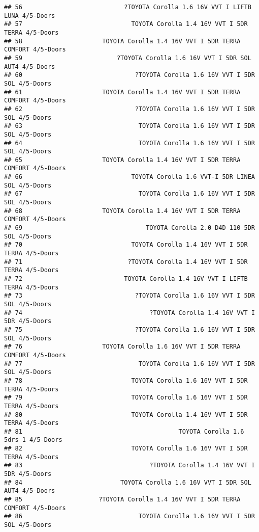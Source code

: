 \documentclass[]{article}
\begin{document}
\begin{verbatim}
## 56                            ?TOYOTA Corolla 1.6 16V VVT I LIFTB LUNA 4/5-Doors
## 57                              TOYOTA Corolla 1.4 16V VVT I 5DR TERRA 4/5-Doors
## 58                      TOYOTA Corolla 1.4 16V VVT I 5DR TERRA COMFORT 4/5-Doors
## 59                          ?TOYOTA Corolla 1.6 16V VVT I 5DR SOL AUT4 4/5-Doors
## 60                               ?TOYOTA Corolla 1.6 16V VVT I 5DR SOL 4/5-Doors
## 61                      TOYOTA Corolla 1.4 16V VVT I 5DR TERRA COMFORT 4/5-Doors
## 62                               ?TOYOTA Corolla 1.6 16V VVT I 5DR SOL 4/5-Doors
## 63                                TOYOTA Corolla 1.6 16V VVT I 5DR SOL 4/5-Doors
## 64                                TOYOTA Corolla 1.6 16V VVT I 5DR SOL 4/5-Doors
## 65                      TOYOTA Corolla 1.4 16V VVT I 5DR TERRA COMFORT 4/5-Doors
## 66                              TOYOTA Corolla 1.6 VVT-I 5DR LINEA SOL 4/5-Doors
## 67                                TOYOTA Corolla 1.6 16V VVT I 5DR SOL 4/5-Doors
## 68                      TOYOTA Corolla 1.4 16V VVT I 5DR TERRA COMFORT 4/5-Doors
## 69                                  TOYOTA Corolla 2.0 D4D 110 5DR SOL 4/5-Doors
## 70                              TOYOTA Corolla 1.4 16V VVT I 5DR TERRA 4/5-Doors
## 71                             ?TOYOTA Corolla 1.4 16V VVT I 5DR TERRA 4/5-Doors
## 72                            TOYOTA Corolla 1.4 16V VVT I LIFTB TERRA 4/5-Doors
## 73                               ?TOYOTA Corolla 1.6 16V VVT I 5DR SOL 4/5-Doors
## 74                                   ?TOYOTA Corolla 1.4 16V VVT I 5DR 4/5-Doors
## 75                               ?TOYOTA Corolla 1.6 16V VVT I 5DR SOL 4/5-Doors
## 76                      TOYOTA Corolla 1.6 16V VVT I 5DR TERRA COMFORT 4/5-Doors
## 77                                TOYOTA Corolla 1.6 16V VVT I 5DR SOL 4/5-Doors
## 78                              TOYOTA Corolla 1.6 16V VVT I 5DR TERRA 4/5-Doors
## 79                              TOYOTA Corolla 1.6 16V VVT I 5DR TERRA 4/5-Doors
## 80                              TOYOTA Corolla 1.4 16V VVT I 5DR TERRA 4/5-Doors
## 81                                           TOYOTA Corolla 1.6 5drs 1 4/5-Doors
## 82                              TOYOTA Corolla 1.6 16V VVT I 5DR TERRA 4/5-Doors
## 83                                   ?TOYOTA Corolla 1.4 16V VVT I 5DR 4/5-Doors
## 84                           TOYOTA Corolla 1.6 16V VVT I 5DR SOL AUT4 4/5-Doors
## 85                     ?TOYOTA Corolla 1.4 16V VVT I 5DR TERRA COMFORT 4/5-Doors
## 86                                TOYOTA Corolla 1.6 16V VVT I 5DR SOL 4/5-Doors

\end{verbatim}
\end{document}
